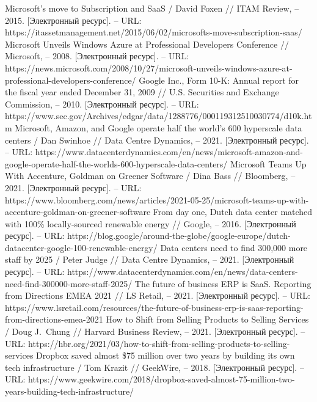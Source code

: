 \documentclass{article}
\begin{document}
\begin{thebibliography}{2}
 Microsoft's move to Subscription and SaaS / David Foxen // ITAM Review, – 2015. [Электронный ресурс]. – URL: https://itassetmanagement.net/2015/06/02/microsofts-move-subscription-saas/
 Microsoft Unveils Windows Azure at Professional Developers Conference // Microsoft, – 2008. [Электронный ресурс]. – URL: https://news.microsoft.com/2008/10/27/microsoft-unveils-windows-azure-at-professional-developers-conference/
 Google Inc., Form 10-K: Annual report for the fiscal year ended December 31, 2009 // U.S. Securities and Exchange Commission, – 2010. [Электронный ресурс]. – URL: https://www.sec.gov/Archives/edgar/data/1288776/000119312510030774/d10k.htm
 Microsoft, Amazon, and Google operate half the world’s 600 hyperscale data centers / Dan Swinhoe // Data Centre Dynamics, – 2021. [Электронный ресурс]. – URL: https://www.datacenterdynamics.com/en/news/microsoft-amazon-and-google-operate-half-the-worlds-600-hyperscale-data-centers/
 Microsoft Teams Up With Accenture, Goldman on Greener Software / Dina Bass // Bloomberg, – 2021. [Электронный ресурс]. – URL: https://www.bloomberg.com/news/articles/2021-05-25/microsoft-teams-up-with-accenture-goldman-on-greener-software
 From day one, Dutch data center matched with 100\% locally-sourced renewable energy // Google, – 2016. [Электронный ресурс]. – URL: https://blog.google/around-the-globe/google-europe/dutch-datacenter-google-100-renewable-energy/
 Data centers need to find 300,000 more staff by 2025 / Peter Judge // Data Centre Dynamics, – 2021. [Электронный ресурс]. – URL: https://www.datacenterdynamics.com/en/news/data-centers-need-find-300000-more-staff-2025/
 The future of business ERP is SaaS. Reporting from Directions EMEA 2021 // LS Retail, – 2021. [Электронный ресурс]. – URL: https://www.lsretail.com/resources/the-future-of-business-erp-is-saas-reporting-from-directions-emea-2021
 How to Shift from Selling Products to Selling Services / Doug J.~Chung // Harvard Business Review, – 2021. [Электронный ресурс]. – URL: https://hbr.org/2021/03/how-to-shift-from-selling-products-to-selling-services
 Dropbox saved almost \$75 million over two years by building its own tech infrastructure / Tom Krazit // GeekWire, – 2018. [Электронный ресурс]. – URL: https://www.geekwire.com/2018/dropbox-saved-almost-75-million-two-years-building-tech-infrastructure/

\end{thebibliography}
\end{document}

